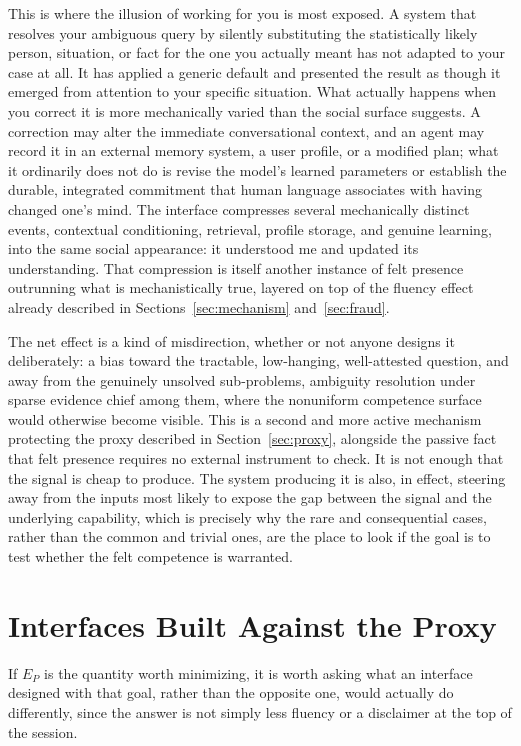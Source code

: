 \documentclass[11pt]{article}
\begin{document}
This is where the illusion of working for you is most exposed. A system that resolves your ambiguous query by silently substituting the statistically likely person, situation, or fact for the one you actually meant has not adapted to your case at all. It has applied a generic default and presented the result as though it emerged from attention to your specific situation. What actually happens when you correct it is more mechanically varied than the social surface suggests. A correction may alter the immediate conversational context, and an agent may record it in an external memory system, a user profile, or a modified plan; what it ordinarily does not do is revise the model's learned parameters or establish the durable, integrated commitment that human language associates with having changed one's mind. The interface compresses several mechanically distinct events, contextual conditioning, retrieval, profile storage, and genuine learning, into the same social appearance: it understood me and updated its understanding. That compression is itself another instance of felt presence outrunning what is mechanistically true, layered on top of the fluency effect already described in Sections~\ref{sec:mechanism} and~\ref{sec:fraud}.

The net effect is a kind of misdirection, whether or not anyone designs it deliberately: a bias toward the tractable, low-hanging, well-attested question, and away from the genuinely unsolved sub-problems, ambiguity resolution under sparse evidence chief among them, where the nonuniform competence surface would otherwise become visible. This is a second and more active mechanism protecting the proxy described in Section~\ref{sec:proxy}, alongside the passive fact that felt presence requires no external instrument to check. It is not enough that the signal is cheap to produce. The system producing it is also, in effect, steering away from the inputs most likely to expose the gap between the signal and the underlying capability, which is precisely why the rare and consequential cases, rather than the common and trivial ones, are the place to look if the goal is to test whether the felt competence is warranted.

\section{Interfaces Built Against the Proxy}
\label{sec:remedies}

If $E_P$ is the quantity worth minimizing, it is worth asking what an interface designed with that goal, rather than the opposite one, would actually do differently, since the answer is not simply less fluency or a disclaimer at the top of the session.
\end{document}
